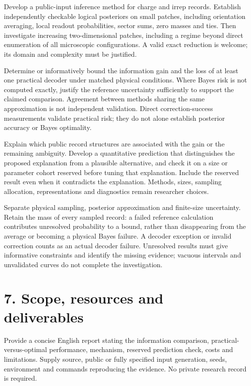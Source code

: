 \documentclass[11pt,letterpaper]{article}
\begin{document}
Develop a public-input inference method for charge and irrep records. Establish independently checkable logical posteriors on small patches, including orientation averaging, local readout probabilities, sector sums, zero masses and ties. Then investigate increasing two-dimensional patches, including a regime beyond direct enumeration of all microscopic configurations. A valid exact reduction is welcome; its domain and complexity must be justified.\par

Determine or informatively bound the information gain and the loss of at least one practical decoder under matched physical conditions. Where Bayes risk is not computed exactly, justify the reference uncertainty sufficiently to support the claimed comparison. Agreement between methods sharing the same approximation is not independent validation. Direct correction-success measurements validate practical risk; they do not alone establish posterior accuracy or Bayes optimality.\par

Explain which public record structures are associated with the gain or the remaining ambiguity. Develop a quantitative prediction that distinguishes the proposed explanation from a plausible alternative, and check it on a size or parameter cohort reserved before tuning that explanation. Include the reserved result even when it contradicts the explanation. Methods, sizes, sampling allocation, representations and diagnostics remain researcher choices.\par

Separate physical sampling, posterior approximation and finite-size uncertainty. Retain the mass of every sampled record: a failed reference calculation contributes unresolved probability to a bound, rather than disappearing from the average or becoming a physical Bayes failure. A decoder exception or invalid correction counts as an actual decoder failure. Unresolved results must give informative constraints and identify the missing evidence; vacuous intervals and unvalidated curves do not complete the investigation.\par

\section*{7. Scope, resources and deliverables}

Provide a concise English report stating the information comparison, practical-versus-optimal performance, mechanism, reserved prediction check, costs and limitations. Supply source, public or fully specified input generation, seeds, environment and commands reproducing the evidence. No private research record is required.\par
\end{document}

